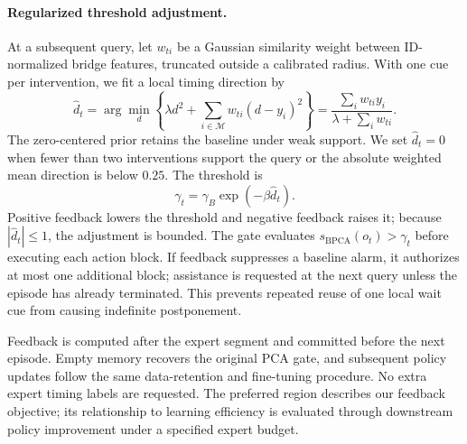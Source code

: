 \paragraph{Regularized threshold adjustment.}
At a subsequent query, let $w_{ti}$ be a Gaussian similarity weight between
ID-normalized bridge features, truncated outside a calibrated radius. With
one cue per intervention, we fit a local timing direction by
\begin{equation}
\widehat d_t
=\arg\min_d\left\{\lambda d^2+
\sum_{i\in\mathcal M}w_{ti}(d-y_i)^2\right\}
=\frac{\sum_i w_{ti}y_i}{\lambda+\sum_i w_{ti}}.
\label{eq:ef_local_direction}
\end{equation}
The zero-centered prior retains the baseline under weak support. We set
$\widehat d_t=0$ when fewer than two interventions support the query or
the absolute weighted mean direction is below $0.25$. The threshold is
\begin{equation}
\gamma_t=\gamma_B\exp(-\beta\widehat d_t).
\label{eq:ef_local_threshold}
\end{equation}
Positive feedback lowers the threshold and negative feedback raises it;
because $|\widehat d_t|\le1$, the adjustment is bounded. The gate evaluates
$s_{\mathrm{BPCA}}(o_t)>\gamma_t$ before executing each action block.
If feedback suppresses a baseline alarm, it authorizes at most one additional
block; assistance is requested at the next query unless the episode has
already terminated. This prevents repeated reuse of one local wait cue from
causing indefinite postponement.

Feedback is computed after the expert segment and committed before the next
episode. Empty memory recovers the original PCA gate, and subsequent policy
updates follow the same data-retention and fine-tuning procedure. No extra
expert timing labels are requested. The preferred region describes our
feedback objective; its relationship to learning efficiency is evaluated
through downstream policy improvement under a specified expert budget.
